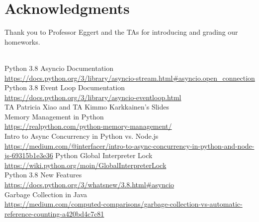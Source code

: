 \section*{Acknowledgments}

Thank you to Professor Eggert and the TAs for introducing and grading our homeworks.



\newpage


\\
Python 3.8 Asyncio Documentation \\
\url{https://docs.python.org/3/library/asyncio-stream.html#asyncio.open_connection} \\
Python 3.8 Event Loop Documentation \\
\url{https://docs.python.org/3/library/asyncio-eventloop.html} \\
TA Patricia Xiao and TA Kimmo Karkkainen's Slides \\
Memory Management in Python \\
\url{https://realpython.com/python-memory-management/} \\
Intro to Async Concurrency in Python vs. Node.js \\
\url{https://medium.com/@interfacer/intro-to-async-concurrency-in-python-and-node-js-69315b1e3e36}
Python Global Interpreter Lock \\
\url{https://wiki.python.org/moin/GlobalInterpreterLock} \\
Python 3.8 New Features \\
\url{https://docs.python.org/3/whatsnew/3.8.html#asyncio} \\
Garbage Collection in Java \\
\url{https://medium.com/computed-comparisons/garbage-collection-vs-automatic-reference-counting-a420bd4c7c81} \\



